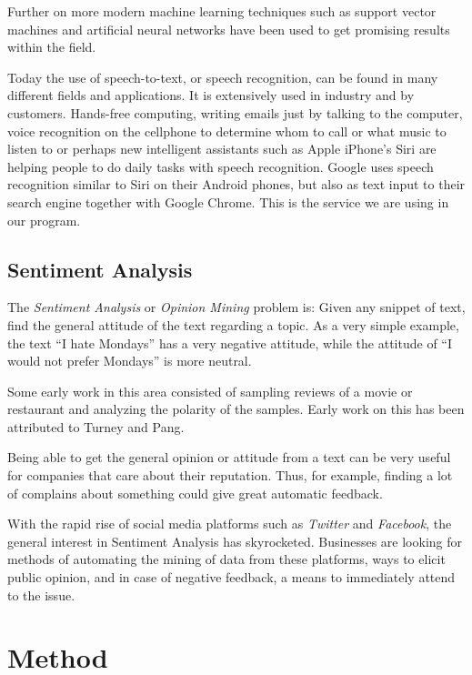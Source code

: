 \documentclass[a4paper,12pt,twoside]{ltxdoc}
\begin{document}
Further on more modern machine learning techniques such as support vector machines and artificial neural networks have been used to get promising results within the field.

Today the use of speech-to-text, or speech recognition, can be found in many different fields and applications. It is extensively used in industry and by customers. Hands-free computing, writing emails just by talking to the computer, voice recognition on the cellphone to determine whom to call or what music to listen to or perhaps new intelligent assistants such as Apple iPhone's Siri are helping people to do daily tasks with speech recognition. Google uses speech recognition similar to Siri on their Android phones, but also as text input to their search engine together with Google Chrome. This is the service we are using in our program.



\subsection{Sentiment Analysis}
The \emph{Sentiment Analysis} or \emph{Opinion Mining} problem is: Given any snippet of text, find the general attitude of the text regarding a topic.
As a very simple example, the text ``I hate Mondays'' has a very negative attitude, while the attitude of ``I would not prefer Mondays'' is more neutral.

Some early work in this area consisted of sampling reviews of a movie or restaurant and analyzing the polarity of the samples. Early work on this has been attributed to Turney\cite{turney} and Pang\cite{pang}.

Being able to get the general opinion or attitude from a text can be very useful for companies that care about their reputation.
Thus, for example, finding a lot of complains about something could give great automatic feedback.

With the rapid rise of social media platforms such as \emph{Twitter} and \emph{Facebook}, the general interest in Sentiment Analysis has skyrocketed. Businesses are looking for methods of automating the mining of data from these platforms, ways to elicit public opinion, and in case of negative feedback, a means to immediately attend to the issue.

\section{Method}
\end{document}
